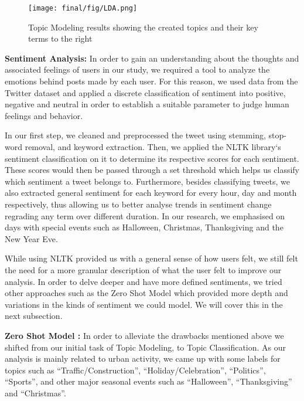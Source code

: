 \begin{figure}[ht]
 \centering %
 \texttt{[image: final/fig/LDA.png]}
 \caption{Topic Modeling results showing the created topics and their key terms to the right}
 \label{fig:tda}
\end{figure}

\textbf{Sentiment Analysis: }
In order to gain an understanding about the thoughts and associated feelings of users in our study, we required a tool to analyze the emotions behind posts made by each user. For this reason, we used data from the Twitter dataset and applied a discrete classification of sentiment into positive, negative and neutral in order to establish a suitable parameter to judge human feelings and behavior. 

In our first step, we cleaned and preprocessed the tweet using stemming, stop-word removal, and keyword extraction. Then, we applied the NLTK library`s sentiment classification on it to determine its respective scores for each sentiment. These scores would then be passed through a set threshold which helps us classify which sentiment a tweet belongs to.  Furthermore, besides classifying tweets, we also extracted general sentiment for each keyword for every hour, day and month respectively, thus allowing us to better analyse trends in sentiment change regrading any term over different duration. In our research, we emphasised on days with special events such as Halloween, Christmas, Thanksgiving and the New Year Eve.

While using NLTK provided us with a general sense of how users felt, we still felt the need for a more granular description of what the user felt to improve our analysis. In order to delve deeper and have more defined sentiments, we tried other approaches such as the Zero Shot Model which provided more depth and variations in the kinds of sentiment we could model. We will cover this in the next subsection.

\textbf{Zero Shot Model : }
In order to alleviate the drawbacks mentioned above we shifted from our initial task of Topic Modeling, to Topic Classification. As our analysis is mainly related to urban activity, we came up with some labels for topics such as ``Traffic/Construction'', ``Holiday/Celebration'', ``Politics'', ``Sports'', and other major seasonal events such as ``Halloween'', ``Thanksgiving'' and ``Christmas''.

